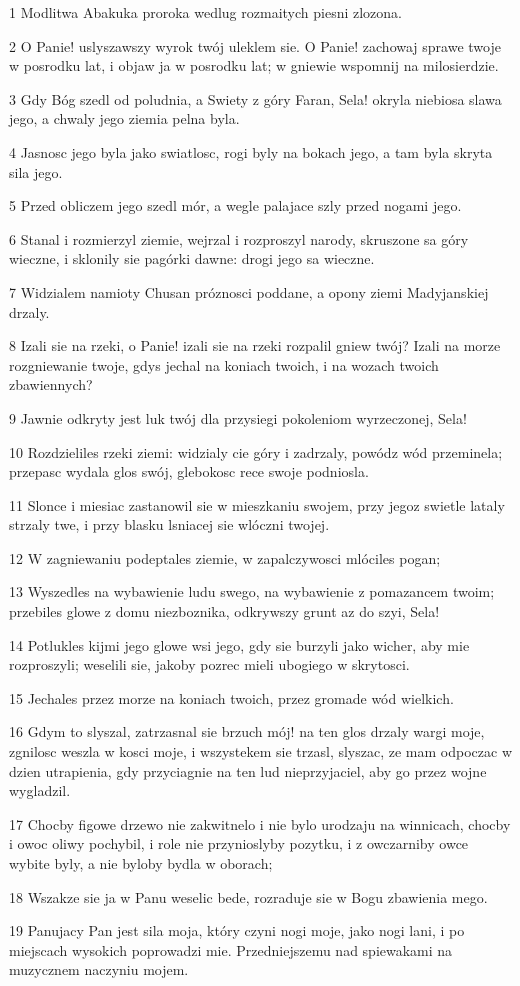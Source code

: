 \par 1 Modlitwa Abakuka proroka wedlug rozmaitych piesni zlozona.
\par 2 O Panie! uslyszawszy wyrok twój uleklem sie. O Panie! zachowaj sprawe twoje w posrodku lat, i objaw ja w posrodku lat; w gniewie wspomnij na milosierdzie.
\par 3 Gdy Bóg szedl od poludnia, a Swiety z góry Faran, Sela! okryla niebiosa slawa jego, a chwaly jego ziemia pelna byla.
\par 4 Jasnosc jego byla jako swiatlosc, rogi byly na bokach jego, a tam byla skryta sila jego.
\par 5 Przed obliczem jego szedl mór, a wegle palajace szly przed nogami jego.
\par 6 Stanal i rozmierzyl ziemie, wejrzal i rozproszyl narody, skruszone sa góry wieczne, i sklonily sie pagórki dawne: drogi jego sa wieczne.
\par 7 Widzialem namioty Chusan próznosci poddane, a opony ziemi Madyjanskiej drzaly.
\par 8 Izali sie na rzeki, o Panie! izali sie na rzeki rozpalil gniew twój? Izali na morze rozgniewanie twoje, gdys jechal na koniach twoich, i na wozach twoich zbawiennych?
\par 9 Jawnie odkryty jest luk twój dla przysiegi pokoleniom wyrzeczonej, Sela!
\par 10 Rozdzieliles rzeki ziemi: widzialy cie góry i zadrzaly, powódz wód przeminela; przepasc wydala glos swój, glebokosc rece swoje podniosla.
\par 11 Slonce i miesiac zastanowil sie w mieszkaniu swojem, przy jegoz swietle lataly strzaly twe, i przy blasku lsniacej sie wlóczni twojej.
\par 12 W zagniewaniu podeptales ziemie, w zapalczywosci mlóciles pogan;
\par 13 Wyszedles na wybawienie ludu swego, na wybawienie z pomazancem twoim; przebiles glowe z domu niezboznika, odkrywszy grunt az do szyi, Sela!
\par 14 Potlukles kijmi jego glowe wsi jego, gdy sie burzyli jako wicher, aby mie rozproszyli; weselili sie, jakoby pozrec mieli ubogiego w skrytosci.
\par 15 Jechales przez morze na koniach twoich, przez gromade wód wielkich.
\par 16 Gdym to slyszal, zatrzasnal sie brzuch mój! na ten glos drzaly wargi moje, zgnilosc weszla w kosci moje, i wszystekem sie trzasl, slyszac, ze mam odpoczac w dzien utrapienia, gdy przyciagnie na ten lud nieprzyjaciel, aby go przez wojne wygladzil.
\par 17 Chocby figowe drzewo nie zakwitnelo i nie bylo urodzaju na winnicach, chocby i owoc oliwy pochybil, i role nie przynioslyby pozytku, i z owczarniby owce wybite byly, a nie byloby bydla w oborach;
\par 18 Wszakze sie ja w Panu weselic bede, rozraduje sie w Bogu zbawienia mego.
\par 19 Panujacy Pan jest sila moja, który czyni nogi moje, jako nogi lani, i po miejscach wysokich poprowadzi mie. Przedniejszemu nad spiewakami na muzycznem naczyniu mojem.


